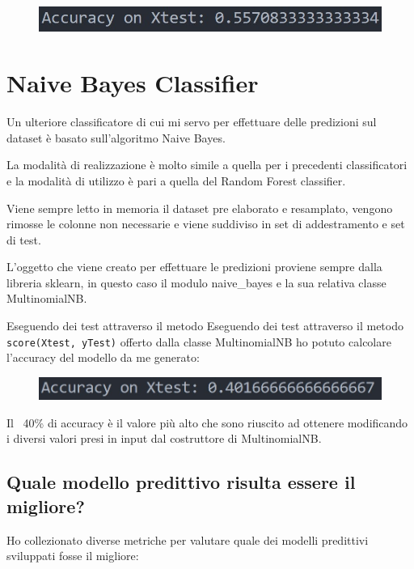 \begin{figure}
    \begin{center}    
        \includegraphics[width=0.9\linewidth]{images/image40.jpeg}
    \end{center}
\end{figure}

\section{Naive Bayes Classifier}
Un ulteriore classificatore di cui mi servo per effettuare delle predizioni sul dataset è basato sull’algoritmo Naive Bayes.

La modalità di realizzazione è molto simile a quella per i precedenti classificatori e la modalità di utilizzo è pari a quella del Random Forest classifier.

Viene sempre letto in memoria il dataset pre elaborato e resamplato, vengono rimosse le colonne non necessarie e viene suddiviso in set di addestramento e set di test.

L’oggetto che viene creato per effettuare le predizioni proviene sempre dalla libreria sklearn, in questo caso il modulo naive\_bayes e la sua relativa classe MultinomialNB.

Eseguendo dei test attraverso il metodo Eseguendo dei test attraverso il metodo \mintinline[bgcolor=bg]
{python}{score(Xtest, yTest)} offerto dalla classe MultinomialNB ho potuto calcolare l’accuracy del modello da me generato:

\begin{figure}
    \begin{center}    
        \includegraphics[width=0.9\linewidth]{images/image41.jpeg}
    \end{center}
\end{figure}

Il ~40\% di accuracy è il valore più alto che sono riuscito ad ottenere modificando i diversi valori presi in input dal costruttore di MultinomialNB.

\subsection{Quale modello predittivo risulta essere il migliore?}
Ho collezionato diverse metriche per valutare quale dei modelli predittivi sviluppati fosse il migliore: 
